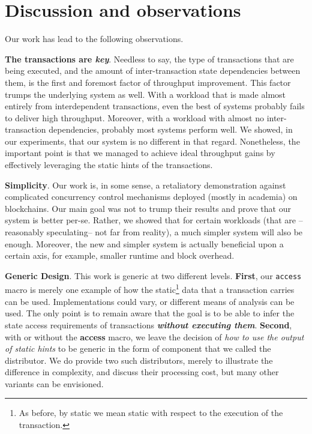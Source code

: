 \section{Discussion and observations} \label{chap_conc:sec:discussion}

Our work has lead to the following observations.

\textbf{The transactions are \textit{key}}. Needless to say, the type of transactions that are being
executed, and the amount of inter-transaction state dependencies between them, is the first and
foremost factor of throughput improvement. This factor trumps the underlying system as well. With a
workload that is made almost entirely from interdependent transactions, even the best of systems
probably fails to deliver high throughput. Moreover, with a workload with almost no
inter-transaction dependencies, probably most systems perform well. We showed, in our experiments,
that our system is no different in that regard. Nonetheless, the important point is that we managed
to achieve ideal throughput gains by effectively leveraging the static hints of the transactions.

\textbf{Simplicity}. Our work is, in some sense, a retaliatory demonstration against complicated
concurrency control mechanisms deployed (mostly in academia) on blockchains. Our main goal was not
to trump their results and prove that our system is better per-se. Rather, we showed that for
certain workloads (that are --reasonably speculating-- not far from reality), a much simpler system
will also be enough. Moreover, the new and simpler system is actually beneficial upon a certain
axis, for example, smaller runtime and block overhead.

\textbf{Generic Design}. This work is generic at two different levels. \textbf{First}, our
\texttt{access} macro is merely one example of how the static\footnote{As before, by static we mean
static with respect to the execution of the transaction.} data that a transaction carries can be
used. Implementations could vary, or different means of analysis can be used. The only point is to
remain aware that the goal is to be able to infer the state access requirements of transactions
\textit{\textbf{without executing them}}. \textbf{Second}, with or without the \textbf{access}
macro, we leave the decision of \textit{how to use the output of static hints} to be generic in the
form of component that we called the distributor. We do provide two such distributors, merely to
illustrate the difference in complexity, and discuss their processing cost, but many other variants
can be envisioned.

